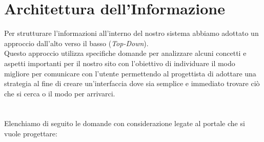 \documentclass[12pt,a4paper]{report}
\begin{document}
\section{Architettura dell'Informazione}
Per strutturare l'informazioni all'interno del nostro sistema abbiamo adottato un approccio dall'alto verso il basso (\textit{Top-Down}).\\
Questo approccio utilizza specifiche domande per analizzare alcuni concetti e aspetti importanti per il nostro sito con l'obiettivo di individuare il modo migliore per comunicare con l'utente permettendo al progettista di adottare una strategia al fine di creare un'interfaccia dove sia semplice e immediato trovare ciò che si cerca o il modo per arrivarci.\\\\\\
Elenchiamo di seguito le domande con considerazione legate al portale che si vuole progettare:
\end{document}
